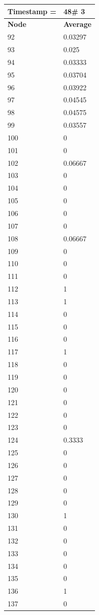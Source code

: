 \begin{tabular}{|l||l|}
\hline
\textbf{Timestamp =} & \textbf{48}\# 3\\\hline
	\textbf{Node} & \textbf{Average} \\ \hline
\hline
	92 & 0.03297 \\ \hline
	93 & 0.025 \\ \hline
	94 & 0.03333 \\ \hline
	95 & 0.03704 \\ \hline
	96 & 0.03922 \\ \hline
	97 & 0.04545 \\ \hline
	98 & 0.04575 \\ \hline
	99 & 0.03557 \\ \hline
	100 & 0 \\ \hline
	101 & 0 \\ \hline
	102 & 0.06667 \\ \hline
	103 & 0 \\ \hline
	104 & 0 \\ \hline
	105 & 0 \\ \hline
	106 & 0 \\ \hline
	107 & 0 \\ \hline
	108 & 0.06667 \\ \hline
	109 & 0 \\ \hline
	110 & 0 \\ \hline
	111 & 0 \\ \hline
	112 & 1 \\ \hline
	113 & 1 \\ \hline
	114 & 0 \\ \hline
	115 & 0 \\ \hline
	116 & 0 \\ \hline
	117 & 1 \\ \hline
	118 & 0 \\ \hline
	119 & 0 \\ \hline
	120 & 0 \\ \hline
	121 & 0 \\ \hline
	122 & 0 \\ \hline
	123 & 0 \\ \hline
	124 & 0.3333 \\ \hline
	125 & 0 \\ \hline
	126 & 0 \\ \hline
	127 & 0 \\ \hline
	128 & 0 \\ \hline
	129 & 0 \\ \hline
	130 & 1 \\ \hline
	131 & 0 \\ \hline
	132 & 0 \\ \hline
	133 & 0 \\ \hline
	134 & 0 \\ \hline
	135 & 0 \\ \hline
	136 & 1 \\ \hline
	137 & 0 \\ \hline
\end{tabular}

